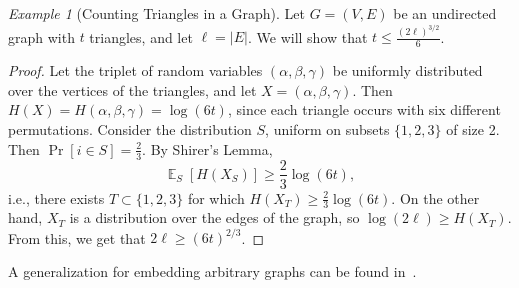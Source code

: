 \documentclass[12pt,sans]{article}
\DeclareMathOperator*{\E}{\mathbb{E}}
\theoremstyle{definition}
\theoremstyle{plain}
\theoremstyle{remark}
\newtheorem{example}{Example}[section]
\begin{document}
\begin{example}[Counting Triangles in a Graph]
    Let \(G = (V, E)\) be an undirected graph with \(t\) triangles, and let \(\ell = |E|\). We will show that \(t \le \frac{(2\ell)^{3/2}}{6}\).
    \begin{proof}
        Let the triplet of random variables \((\alpha, \beta, \gamma)\) be uniformly distributed over the vertices of the triangles, and let \(X = (\alpha, \beta, \gamma)\). Then \(H(X) = H(\alpha, \beta, \gamma) = \log(6t)\), since each triangle occurs with six different permutations. Consider the distribution \(S\), uniform on subsets \(\{1, 2, 3\}\) of size 2. Then \(\Pr[i \in S] = \frac{2}{3}\). By Shirer's Lemma,
    \[
        \E_S[H(X_S)] \ge \frac{2}{3} \log(6t),
    \]
    i.e., there exists \(T \subset \{1, 2, 3\}\) for which \(H(X_T) \ge \frac{2}{3} \log(6t)\).
    On the other hand, \(X_T\) is a distribution over the edges of the graph, so \(\log(2\ell) \ge H(X_T)\). From this, we get that \(2\ell \ge (6t)^{2/3}\).
    \end{proof}
    A generalization for embedding arbitrary graphs can be found in~\cite{rao10}.
\end{example}
\end{document}
